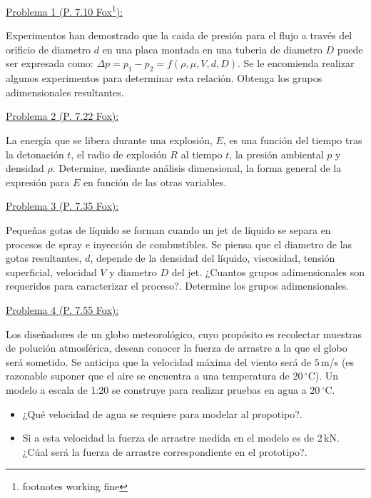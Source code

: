 \documentclass[11pt]{report}
\begin{document}

\vspace{1cm}


\vspace{1cm}

\underline {Problema 1 (P. 7.10 Fox\footnote{footnotes working fine}):}
\vspace{0.2cm}

Experimentos han demostrado que la caida de presi\'on para el flujo a trav\'es del orificio de diametro $d$ en una placa montada en una tuberia de diametro $D$ puede ser expresada como: $\Delta p = p_1 - p_2 = f(\rho,\mu,{V},d,D)$. Se le encomienda realizar algunos experimentos para determinar esta relaci\'on. Obtenga los grupos adimensionales resultantes.
\vspace{0.2cm}

\underline {Problema 2 (P. 7.22 Fox):}
\vspace{0.2cm}

La energ\'ia que se libera durante una explosi\'on, $E$, es una funci\'on del tiempo tras la detonaci\'on $t$, el radio de explosi\'on $R$ al tiempo $t$, la presi\'on ambiental $p$ y densidad $\rho$. Determine, mediante an\'alisis dimensional, la forma general de la expresi\'on para $E$ en funci\'on de las otras variables.
\vspace{0.2cm}

\underline {Problema 3 (P. 7.35 Fox):}
\vspace{0.2cm}

Pequeñas gotas de l\'iquido se forman cuando un jet de l\'iquido se separa en procesos de spray e inyecci\'on de combustibles. Se piensa que el diametro de las gotas resultantes, $d$, depende de la densidad del l\'iquido, viscosidad, tensi\'on superficial, velocidad $V$ y diametro $D$ del jet. ¿Cuantos grupos adimensionales son requeridos para caracterizar el proceso?. Determine los grupos adimensionales.
\vspace{0.2cm}

\underline {Problema 4 (P. 7.55 Fox):}
\vspace{0.2cm}

Los diseñadores de un globo meteorol\'ogico, cuyo prop\'osito es recolectar muestras de poluci\'on atmosf\'erica, desean conocer la fuerza de arrastre a la que el globo ser\'a sometido. Se anticipa que la velocidad m\'axima del viento ser\'a de $5$\,m/s (es razonable suponer que el aire se encuentra a una temperatura de $20$\,$^\circ$C). Un modelo a escala de 1:20 se construye para realizar pruebas en agua a $20$\,$^\circ$C. 
\begin{itemize}
\item ¿Qu\'e velocidad de agua se requiere para modelar al propotipo?.
\item Si a esta velocidad la fuerza de arrastre medida en el modelo es de $2$\,kN. ¿C\'ual ser\'a la fuerza de arrastre correspondiente en el prototipo?.
\end{itemize}
\vspace{0.2cm}
\end{document}
